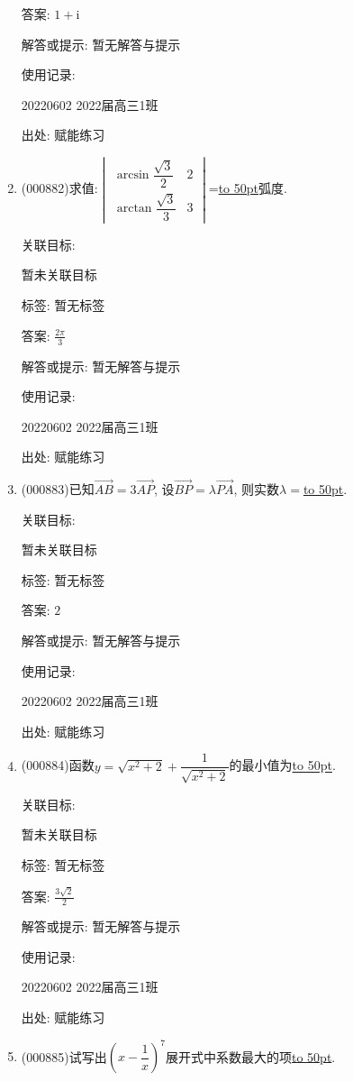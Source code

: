 \documentclass[10pt,a4paper]{article}
\newcommand{\blank}[1]{\underline{\hbox to #1pt{}}}
\begin{document}
\begin{enumerate}[1.]
答案: $1+\mathrm{i}$

解答或提示: 暂无解答与提示

使用记录:

20220602	2022届高三1班	


出处: 赋能练习
\item { (000882)}求值:$\begin{vmatrix}\arcsin\dfrac{\sqrt3}2 & 2  \\ \arctan\dfrac{\sqrt3}3 & 3  \end{vmatrix}$=\blank{50}弧度.


关联目标:

暂未关联目标



标签: 暂无标签

答案: $\frac{2\pi}3$

解答或提示: 暂无解答与提示

使用记录:

20220602	2022届高三1班	


出处: 赋能练习
\item { (000883)}已知$\overrightarrow{AB}=3\overrightarrow{AP}$, 设$\overrightarrow{BP}=\lambda \overrightarrow{PA}$, 则实数$\lambda=$\blank{50}.


关联目标:

暂未关联目标



标签: 暂无标签

答案: $2$

解答或提示: 暂无解答与提示

使用记录:

20220602	2022届高三1班	


出处: 赋能练习
\item { (000884)}函数$y=\sqrt{x^2+2}+\dfrac1{\sqrt{x^2+2}}$的最小值为\blank{50}.


关联目标:

暂未关联目标



标签: 暂无标签

答案: $\frac{3\sqrt 2}2$

解答或提示: 暂无解答与提示

使用记录:

20220602	2022届高三1班	


出处: 赋能练习
\item { (000885)}试写出$(x-\dfrac1x)^7$展开式中系数最大的项\blank{50}.



\end{enumerate}
\end{document}
